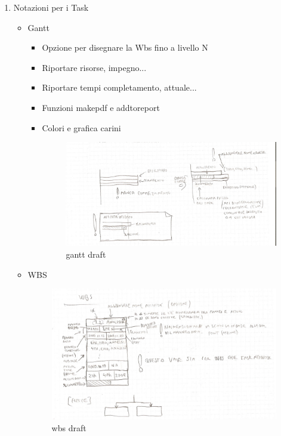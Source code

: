 \begin{enumerate}
\begin{itemize}
\end{itemize}
\item Notazioni per i Task
\begin{itemize}
\item Gantt
	\begin{itemize}
		\item Opzione per disegnare la Wbs fino a livello N
		\item Riportare risorse, impegno...
		\item Riportare tempi completamento, attuale...
		\item Funzioni makepdf e addtoreport
		\item Colori e grafica carini
			\begin{figure}[h] 
				\centering 
				\includegraphics[width=1\textwidth]{gantt_draft.png} 
				\caption{gantt draft}
				\label{fig:firstAnalisys_GanttChart}			
			\end{figure}
	\end{itemize}

\item{WBS}
	\begin{figure}[h] 
				\centering 
				\includegraphics[width=1\textwidth]{wbs_draft.png} 
				\caption{wbs draft}
				\label{fig:firstAnalisys_WBSChart}			
			\end{figure}
\end{itemize}
\end{enumerate}

